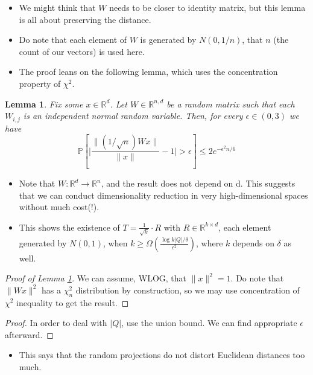 \documentclass[11pt,reqno]{amsart}
\newtheorem{lemma}[theorem]{Lemma}
\theoremstyle{remark}
\begin{document}
\begin{sloppypar}
\begin{itemize}
\item We might think that $W$ needs to be closer to identity matrix, but this lemma is all about preserving the distance.
\item Do note that each element of $W$ is generated by $N(0,1/n)$, that $n$ (the count of our vectors) is used here.
\item The proof leans on the following lemma, which uses the concentration property of $\chi^2$.
\end{itemize}
\begin{lemma}\label{lem:concentration}
Fix some $x\in\mathbb{R}^d$. Let $W\in\mathbb{R}^{n,d}$ be a random matrix such that each $W_{i,j}$
 is an independent normal random variable. Then, for every $\epsilon\in (0,3)$ we have
 \begin{equation}
 \mathbb{P}[\lvert \frac{\lVert (1/\sqrt n)Wx\rVert}{\lVert 
    x\rVert}-1 \rvert>\epsilon]\leq 2e^{-\epsilon^2 n/6}
 \end{equation}
\end{lemma}
\begin{itemize}
\item Note that $W:\mathbb{R}^d\to\mathbb{R}^n$, and the result does not depend on d. This suggests
 that we can conduct dimensionality reduction in very high-dimensional spaces without much cost(!).
\item This shows the existence of $T=\frac{1}{\sqrt k}\cdot R$ with
 $R\in \mathbb{R}^{k\times d}$, each element generated by $N(0,1)$, when 
 $k\geq \Omega(\frac {\log{k\lvert Q\rvert}/\delta}{\epsilon^2})$, where $k$ depends on $\delta$ as well. 
\end{itemize}
\begin{proof}[Proof of Lemma \ref{lem:concentration}]
We can assume, WLOG, that $\lVert x\rVert^2=1$. Do note that $\lVert Wx\rVert^2$ has a $\chi_n^2$ distribution
 by construction, so we may use concentration of $\chi^2$ inequality to get the result.
\end{proof}
\begin{proof}
In order to deal with $\lvert Q\rvert$, use the union bound. We can find appropriate $\epsilon$ afterward.
\end{proof}
\begin{itemize}
\item This says that the random projections do not distort Euclidean distances too much.
\end{itemize}


\end{sloppypar}
\end{document}
